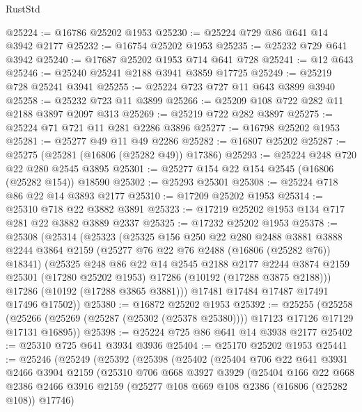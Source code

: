 \begin{lexlean}{RustStd}
\begin{coremodule}
@25224 := @16786 @25202 @1953
@25230 := @25224 @729 @86 @641 @14 @3942 @2177
@25232 := @16754 @25202 @1953
@25235 := @25232 @729 @641 @3942
@25240 := @17687 @25202 @1953 @714 @641 @728
@25241 := @12 @643
@25246 := @25240 @25241 @2188 @3941 @3859 @17725
@25249 := @25219 @728 @25241 @3941
@25255 := @25224 @723 @727 @11 @643 @3899 @3940
@25258 := @25232 @723 @11 @3899
@25266 := @25209 @108 @722 @282 @11 @2188 @3897 @2097 @313
@25269 := @25219 @722 @282 @3897
@25275 := @25224 @71 @721 @11 @281 @2286 @3896
@25277 := @16798 @25202 @1953
@25281 := @25277 @49 @11 @49 @2286
@25282 := @16807 @25202
@25287 := @25275 (@25281 (@16806 (@25282 @49)) @17386)
@25293 := @25224 @248 @720 @22 @280 @2545 @3895
@25301 := @25277 @154 @22 @154 @2545 (@16806 (@25282 @154)) @18590
@25302 := @25293 @25301
@25308 := @25224 @718 @86 @22 @14 @3893 @2177
@25310 := @17209 @25202 @1953
@25314 := @25310 @718 @22 @3882 @3891
@25323 := @17219 @25202 @1953 @134 @717 @281 @22 @3882 @3889 @2337
@25325 := @17232 @25202 @1953
@25378 := @25308
    (@25314
      (@25323
        (@25325
          @156
          @250
          @22
          @280
          @2488
          @3881
          @3888
          @2244
          @3864
          @2159
          (@25277 @76 @22 @76 @2488 (@16806 (@25282 @76)) @18341)
          (@25325
            @248
            @86
            @22
            @14
            @2545
            @2188
            @2177
            @2244
            @3874
            @2159
            @25301
            (@17280 @25202 @1953)
            @17286
            (@10192 (@17288 @3875 @2188)))
          @17286
          (@10192 (@17288 @3865 @3881)))
        @17481
        @17484
        @17487
        @17491
        @17496
        @17502))
@25380 := @16872 @25202 @1953
@25392 := @25255
    (@25258 (@25266 (@25269 (@25287 (@25302 (@25378 @25380)))) @17123 @17126 @17129 @17131 @16895))
@25398 := @25224 @725 @86 @641 @14 @3938 @2177
@25402 := @25310 @725 @641 @3934 @3936
@25404 := @25170 @25202 @1953
@25441 := @25246
    (@25249
      (@25392
        (@25398
          (@25402
            (@25404
              @706
              @22
              @641
              @3931
              @2466
              @3904
              @2159
              (@25310
                @706
                @668
                @3927
                @3929
                (@25404
                  @166
                  @22
                  @668
                  @2386
                  @2466
                  @3916
                  @2159
                  (@25277 @108 @669 @108 @2386 (@16806 (@25282 @108)) @17746)

\end{coremodule}
\end{lexlean}
